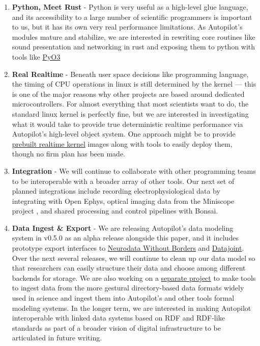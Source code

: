 \begin{enumerate}[ref=\thechapter.\arabic*]
    \item \label{future:rust}\textbf{Python, Meet Rust} - Python is very useful as a high-level glue language, and its accessibility to a large number of scientific programmers is important to us, but it has its own very real performance limitations. As Autopilot's modules mature and stabilize, we are interested in rewriting core routines like sound presentation and networking in rust and exposing them to python with tools like \href{https://github.com/PyO3/pyo3}{PyO3}
    \item \label{future:realtime}\textbf{Real Realtime} - Beneath user space decisions like programming language, the timing of CPU operations in linux is still determined by the kernel --- this is one of the major reasons why other projects are based around dedicated microcontrollers. For almost everything that most scientists want to do, the standard linux kernel is perfectly fine, but we are interested in investigating what it would take to provide true deterministic realtime performance via Autopilot's high-level object system. One approach might be to provide \href{https://github.com/ros-realtime/linux-real-time-kernel-builder}{prebuilt realtime kernel} images along with tools to easily deploy them, though no firm plan has been made.
    \item \label{item:othertools} \textbf{Integration} - We will continue to collaborate with other programming teams to be interoperable with a broader array of other tools. Our next set of planned integrations include recording electrophysiological data by integrating with Open Ephys\citep{siegleOpenEphysOpensource2017}, optical imaging data from the Miniscope project \citep{aharoniCircuitInvestigationsOpenSource2019,aharoniAllLightThat2019}, and shared processing and control pipelines with Bonsai\citep{lopesBonsaiEventbasedFramework2015b}.
    \item \label{future:data}\textbf{Data Ingest \& Export} - We are releasing Autopilot's data modeling system in v0.5.0 as an alpha release alongside this paper, and it includes prototype export interfaces to \href{https://www.nwb.org/}{Neurodata Without Borders}\citep{rubelNWBAccessibleData2019} and \href{https://www.datajoint.com/}{Datajoint}\citep{yatsenkoDataJointSimplerRelational2018a}. Over the next several releases, we will continue to clean up our data model so that researchers can easily structure their data and choose among different backends for storage. We are also working on a \href{https://github.com/auto-pi-lot/ingesture}{separate project} to make tools to ingest data from the more gestural directory-based data formats widely used in science and ingest them into Autopilot's and other tools formal modeling systems. In the longer term, we are interested in making Autopilot interoperable with linked data systems based on RDF and RDF-like standards as part of a broader vision of digital infrastructure to be articulated in future writing.

\end{enumerate}
